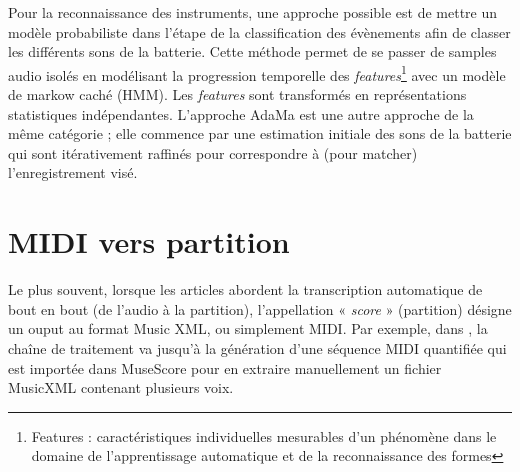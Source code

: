 Pour la reconnaissance des instruments, une approche possible \cite{Eronen} 
est de mettre un modèle probabiliste dans l’étape de la classification des
évènements 
afin de classer les différents sons de la batterie. Cette méthode permet de se
passer de samples audio isolés en modélisant la progression temporelle des
\textit{features}\footnote{Features : caractéristiques individuelles mesurables
d'un phénomène dans le domaine de l'apprentissage automatique et de la
reconnaissance des formes} avec un modèle de markow caché (HMM). Les
\textit{features} sont transformés en représentations statistiques
indépendantes.  L’approche AdaMa \cite{adama_1} est une autre approche
de la même catégorie ; elle commence par une estimation initiale des sons de la
batterie qui sont itérativement raffinés pour correspondre à (pour matcher)
l’enregistrement visé.

\section{MIDI vers partition}
Le plus souvent, lorsque les articles abordent la transcription automatique de
bout en bout (de l’audio à la partition), l’appellation « \textit{score} »
(partition) désigne un ouput au format Music XML, ou simplement MIDI. 
Par exemple, dans \cite{SHIBATA2021262}, la chaîne de traitement va jusqu’à la
génération d’une séquence MIDI quantifiée qui est importée dans MuseScore pour
en extraire manuellement un fichier MusicXML contenant plusieurs voix.

